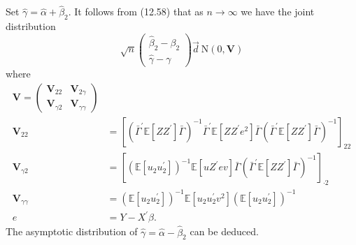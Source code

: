\documentclass[10pt]{article}
\begin{document}
Set $\widehat{\gamma}=\widehat{\alpha}+\widehat{\beta}_{2}$. It follows from (12.58) that as $n \rightarrow \infty$ we have the joint distribution
$$
\sqrt{n}\left(\begin{array}{c}
\widehat{\beta}_{2}-\beta_{2} \\
\widehat{\gamma}-\gamma
\end{array}\right) \vec{d} \mathrm{~N}(0, \boldsymbol{V})
$$
where
$$
\begin{aligned}
\boldsymbol{V}=\left(\begin{array}{ll}
\boldsymbol{V}_{22} & \boldsymbol{V}_{2 \gamma} \\
\boldsymbol{V}_{\gamma 2} & \boldsymbol{V}_{\gamma \gamma}
\end{array}\right) \\
\boldsymbol{V}_{22} &=\left[\left(\bar{\Gamma}^{\prime} \mathbb{E}\left[Z Z^{\prime}\right] \bar{\Gamma}\right)^{-1} \bar{\Gamma}^{\prime} \mathbb{E}\left[Z Z^{\prime} e^{2}\right] \bar{\Gamma}\left(\bar{\Gamma}^{\prime} \mathbb{E}\left[Z Z^{\prime}\right] \bar{\Gamma}\right)^{-1}\right]_{22} \\
\boldsymbol{V}_{\gamma 2} &=\left[\left(\mathbb{E}\left[u_{2} u_{2}^{\prime}\right]\right)^{-1} \mathbb{E}\left[u Z^{\prime} e v\right] \bar{\Gamma}\left(\bar{\Gamma}^{\prime} \mathbb{E}\left[Z Z^{\prime}\right] \bar{\Gamma}\right)^{-1}\right]_{\cdot 2} \\
\boldsymbol{V}_{\gamma \gamma} &=\left(\mathbb{E}\left[u_{2} u_{2}^{\prime}\right]\right)^{-1} \mathbb{E}\left[u_{2} u_{2}^{\prime} v^{2}\right]\left(\mathbb{E}\left[u_{2} u_{2}^{\prime}\right]\right)^{-1} \\
e &=Y-X^{\prime} \beta .
\end{aligned}
$$
The asymptotic distribution of $\widehat{\gamma}=\widehat{\alpha}-\widehat{\beta}_{2}$ can be deduced.
\end{document}
